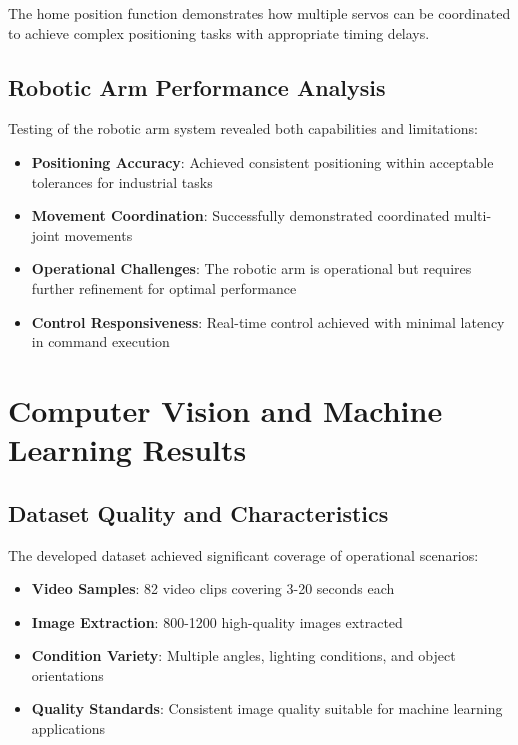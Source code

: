 \documentclass{book}
\begin{document}
\par\noindent The home position function demonstrates how multiple servos can be coordinated to achieve complex positioning tasks with appropriate timing delays.

\subsection{Robotic Arm Performance Analysis}

\par\noindent Testing of the robotic arm system revealed both capabilities and limitations:

\begin{itemize}
\item \textbf{Positioning Accuracy}: Achieved consistent positioning within acceptable tolerances for industrial tasks
\item \textbf{Movement Coordination}: Successfully demonstrated coordinated multi-joint movements
\item \textbf{Operational Challenges}: The robotic arm is operational but requires further refinement for optimal performance
\item \textbf{Control Responsiveness}: Real-time control achieved with minimal latency in command execution
\end{itemize}

\section{Computer Vision and Machine Learning Results}

\subsection{Dataset Quality and Characteristics}

\par\noindent The developed dataset achieved significant coverage of operational scenarios:

\begin{itemize}
\item \textbf{Video Samples}: 82 video clips covering 3-20 seconds each
\item \textbf{Image Extraction}: 800-1200 high-quality images extracted
\item \textbf{Condition Variety}: Multiple angles, lighting conditions, and object orientations
\item \textbf{Quality Standards}: Consistent image quality suitable for machine learning applications
\end{itemize}
\end{document}
